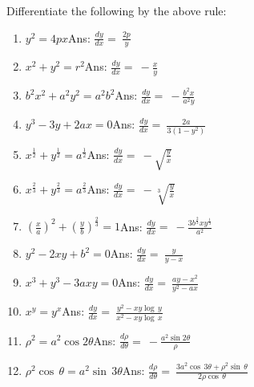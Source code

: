 Differentiate the following by the above rule:

\begin{enumerate}

\item
$y^2 = 4px$\qquad\qquad\qquad\qquad\qquad\qquad Ans:  
$\frac{dy}{dx} 	=\ \frac{2p}{y}$

\item
$x^2 + y^2 = r^2$\qquad\qquad\qquad\qquad\qquad\qquad Ans:  	
$\frac{dy}{dx} 	=\ -\frac{x}{y}$

\item
$b^2x^2 + a^2y^2 = a^2b^2$\qquad\qquad\qquad\qquad\qquad\qquad Ans: 
$\frac{dy}{dx} 	=\ -\frac{b^2x}{a^2y}$

\item
$y^3 - 3y + 2ax = 0$\qquad\qquad\qquad\qquad\qquad\qquad Ans:  
$\frac{dy}{dx} 	=\ \frac{2a}{3(1 - y^2)}$

\item
$x^{\frac{1}{2}} + y^{\frac{1}{2}} = a^{\frac{1}{2}}$\qquad\qquad\qquad\qquad\qquad\qquad Ans:  
$\frac{dy}{dx} 	=\ -\sqrt{\frac{y}{x}}$

\item
$x^{\frac{2}{3}} + y^{\frac{2}{3}} = a^{\frac{2}{3}}$\qquad\qquad\qquad\qquad\qquad\qquad Ans: 
$\frac{dy}{dx} 	=\ -\sqrt[3]{\frac{y}{x}}$

\item
$\left ( \frac{x}{a} \right )^2 + \left ( \frac{y}{b} \right )^{\frac{2}{3}} = 1$\qquad\qquad\qquad\qquad\qquad\qquad Ans:  	
$\frac{dy}{dx} 	=\ -\frac{3b^{\frac{2}{3}}xy^{\frac{1}{3}}}{a^2}$

\item
$y^2 - 2xy + b^2 = 0$\qquad\qquad\qquad\qquad\qquad\qquad Ans:  
$\frac{dy}{dx} 	=\ \frac{y}{y - x}$

\item
$x^3 + y^3 - 3axy = 0$\qquad\qquad\qquad\qquad\qquad\qquad Ans: 
$\frac{dy}{dx} 	=\ \frac{ay - x^2}{y^2 - ax}$

\item
$x^y = y^x$\qquad\qquad\qquad\qquad\qquad\qquad Ans:  
$\frac{dy}{dx} 	=\ \frac{y^2 - xy\log\, y}{x^2 - xy\log\, x}$

\item
$\rho^2 = a^2 \cos 2\theta$\qquad\qquad\qquad\qquad\qquad\qquad Ans:  	
$\frac{d\rho}{d\theta} 	=\ -\frac{a^2 \sin 2\theta}{\rho}$

\item
$\rho^2 \cos\, \theta = a^2 \sin\, 3\theta$\qquad\qquad\qquad\qquad\qquad\qquad Ans:  	
$\frac{d\rho}{d\theta} 	=\ \frac{3a^2 \cos\, 3\theta + \rho^2 \sin\, \theta}{2\rho \cos\, \theta}$


\end{enumerate}
